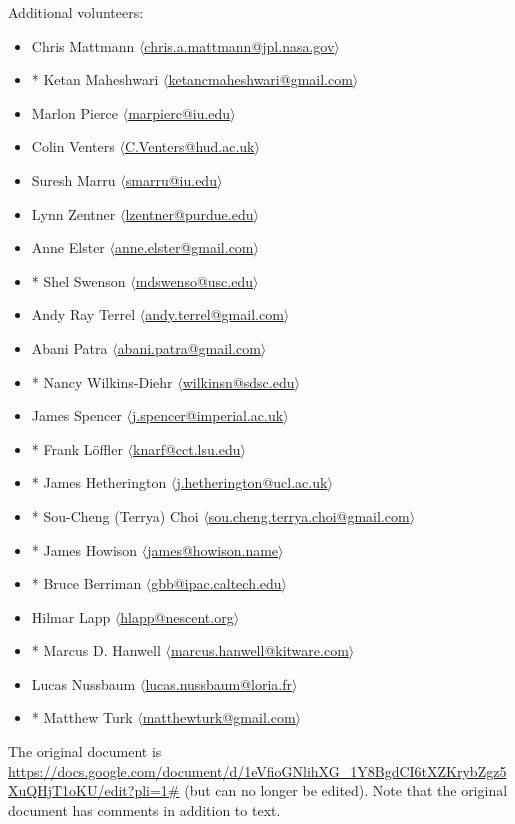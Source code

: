 \documentclass[11pt, oneside]{amsart}
\begin{document}
Additional volunteers:
\begin{itemize}
\item Chris Mattmann $\langle$\url{chris.a.mattmann@jpl.nasa.gov}$\rangle$
\item * Ketan Maheshwari $\langle$\url{ketancmaheshwari@gmail.com}$\rangle$
\item Marlon Pierce $\langle$\url{marpierc@iu.edu}$\rangle$
\item Colin Venters $\langle$\url{C.Venters@hud.ac.uk}$\rangle$
\item Suresh Marru $\langle$\url{smarru@iu.edu}$\rangle$
\item Lynn Zentner $\langle$\url{lzentner@purdue.edu}$\rangle$
\item Anne Elster $\langle$\url{anne.elster@gmail.com}$\rangle$
\item * Shel Swenson $\langle$\url{mdswenso@usc.edu}$\rangle$
\item Andy Ray Terrel $\langle$\url{andy.terrel@gmail.com}$\rangle$
\item Abani Patra $\langle$\url{abani.patra@gmail.com}$\rangle$
\item * Nancy Wilkins-Diehr $\langle$\url{wilkinsn@sdsc.edu}$\rangle$
\item James Spencer $\langle$\url{j.spencer@imperial.ac.uk}$\rangle$
\item * Frank L\"{o}ffler $\langle$\url{knarf@cct.lsu.edu}$\rangle$
\item * James Hetherington $\langle$\url{j.hetherington@ucl.ac.uk}$\rangle$
\item * Sou-Cheng (Terrya) Choi $\langle$\url{sou.cheng.terrya.choi@gmail.com}$\rangle$
\item * James Howison $\langle$\url{james@howison.name}$\rangle$
\item * Bruce Berriman $\langle$\url{gbb@ipac.caltech.edu}$\rangle$
\item Hilmar Lapp $\langle$\url{hlapp@nescent.org}$\rangle$
\item * Marcus D. Hanwell $\langle$\url{marcus.hanwell@kitware.com}$\rangle$
\item Lucas Nussbaum $\langle$\url{lucas.nussbaum@loria.fr}$\rangle$
\item * Matthew Turk $\langle$\url{matthewturk@gmail.com}$\rangle$
\end{itemize}

The original document is
\url{https://docs.google.com/document/d/1eVfioGNlihXG_1Y8BgdCI6tXZKrybZgz5XuQHjT1oKU/edit?pli=1#}
(but can no longer be edited).  Note that the original document has
comments in addition to text.
\end{document}
